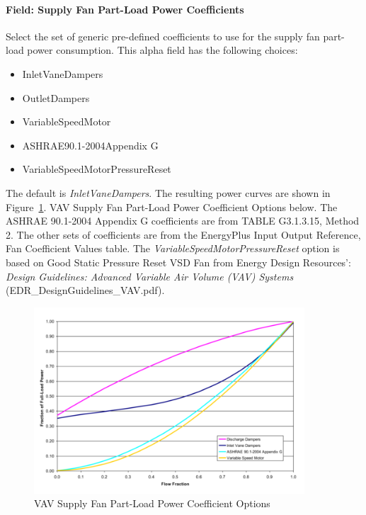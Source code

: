 \paragraph{Field: Supply Fan Part-Load Power Coefficients}\label{field-supply-fan-part-load-power-coefficients}

Select the set of generic pre-defined coefficients to use for the supply fan part-load power consumption. This alpha field has the following choices:

\begin{itemize}
\item
  InletVaneDampers
\item
  OutletDampers
\item
  VariableSpeedMotor
\item
  ASHRAE90.1-2004Appendix G
\item
  VariableSpeedMotorPressureReset
\end{itemize}

The default is \emph{InletVaneDampers}. The resulting power curves are shown in Figure~\ref{fig:vav-supply-fan-part-load-power-coefficient}. VAV Supply Fan Part-Load Power Coefficient Options below. The ASHRAE 90.1-2004 Appendix G coefficients are from TABLE G3.1.3.15, Method 2. The other sets of coefficients are from the EnergyPlus Input Output Reference, Fan Coefficient Values table. The \emph{VariableSpeedMotorPressureReset} option is based on Good Static Pressure Reset VSD Fan from Energy Design Resources': \emph{Design Guidelines: Advanced Variable Air Volume (VAV) Systems} (EDR\_DesignGuidelines\_VAV.pdf).

\begin{figure}[hbtp] %
\centering
\includegraphics[width=0.9\textwidth, height=0.9\textheight, keepaspectratio=true]{media/image611.png}
\caption{VAV Supply Fan Part-Load Power Coefficient Options \protect \label{fig:vav-supply-fan-part-load-power-coefficient}}
\end{figure}

